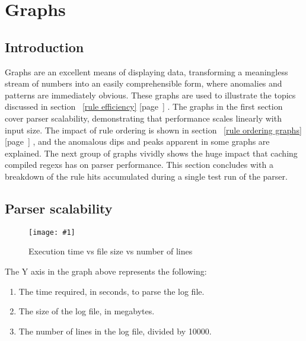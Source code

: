 \documentclass[a4paper,12pt,draft]{article}
\newcommand{\showgraph}[3]{
    \begin{figure}[hbt!]
        \caption{#2}\label{#3}
        \texttt{[image: \#1]}
    \end{figure}
}
\newcommand{\refwithpage}[1]{%
    \empty{}\ref{#1} [page~\pageref{#1}]%
}
\begin{document}


\label{bibliography}

\section{Graphs}

\label{graphs}

\renewcommand{\figurename}{Graph}

\subsection{Introduction}

Graphs are an excellent means of displaying data, transforming a
meaningless stream of numbers into an easily comprehensible form, where
anomalies and patterns are immediately obvious.  These graphs are used to
illustrate the topics discussed in section~\refwithpage{rule efficiency}.
The graphs in the first section cover parser scalability, demonstrating
that performance scales linearly with input size.  The impact of rule
ordering is shown in section~\refwithpage{rule ordering graphs}, and the
anomalous dips and peaks apparent in some graphs are explained.  The next
group of graphs vividly shows the huge impact that caching compiled regexs
has on parser performance.  This section concludes with a breakdown of the
rule hits accumulated during a single test run of the parser.

\subsection{Parser scalability}

\showgraph{build/plot-normal-filesize-numlines.ps}{Execution time vs file
size vs number of lines}{execution time vs file size vs number of lines graph}

The Y axis in the graph above represents the following:

\begin{enumerate}

    \item The time required, in seconds, to parse the log file.

    \item The size of the log file, in megabytes.

    \item The number of lines in the log file, divided by 10000.

\end{enumerate}
\end{document}

